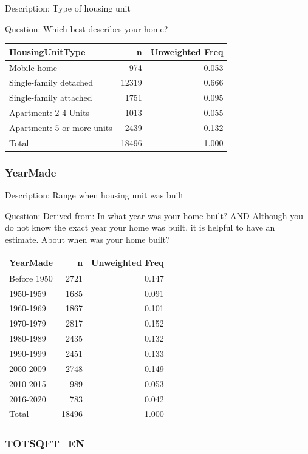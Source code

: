 \documentclass[
]{krantz}
\begin{document}
Description: Type of housing unit

Question: Which best describes your home?

\begin{tabular}[t]{l|r|r}
\hline
HousingUnitType & n & Unweighted Freq\\
\hline
Mobile home & 974 & 0.053\\
\hline
Single-family detached & 12319 & 0.666\\
\hline
Single-family attached & 1751 & 0.095\\
\hline
Apartment: 2-4 Units & 1013 & 0.055\\
\hline
Apartment: 5 or more units & 2439 & 0.132\\
\hline
Total & 18496 & 1.000\\
\hline
\end{tabular}

\hypertarget{yearmade}{%
\subsubsection*{YearMade}\label{yearmade}}


Description: Range when housing unit was built

Question: Derived from: In what year was your home built? AND Although you do not know the exact year your home was built, it is helpful to have an estimate. About when was your home built?

\begin{tabular}[t]{l|r|r}
\hline
YearMade & n & Unweighted Freq\\
\hline
Before 1950 & 2721 & 0.147\\
\hline
1950-1959 & 1685 & 0.091\\
\hline
1960-1969 & 1867 & 0.101\\
\hline
1970-1979 & 2817 & 0.152\\
\hline
1980-1989 & 2435 & 0.132\\
\hline
1990-1999 & 2451 & 0.133\\
\hline
2000-2009 & 2748 & 0.149\\
\hline
2010-2015 & 989 & 0.053\\
\hline
2016-2020 & 783 & 0.042\\
\hline
Total & 18496 & 1.000\\
\hline
\end{tabular}

\hypertarget{totsqft_en}{%
\subsubsection*{TOTSQFT\_EN}\label{totsqft_en}}
\end{document}
